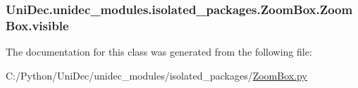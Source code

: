 \subsubsection[{visible}]{\setlength{\rightskip}{0pt plus 5cm}Uni\+Dec.\+unidec\+\_\+modules.\+isolated\+\_\+packages.\+Zoom\+Box.\+Zoom\+Box.\+visible}\label{class_uni_dec_1_1unidec__modules_1_1isolated__packages_1_1_zoom_box_1_1_zoom_box_a2d7d9c153ef672843f244d9a288479ac}


The documentation for this class was generated from the following file\+:\begin{DoxyCompactItemize}
\item 
C\+:/\+Python/\+Uni\+Dec/unidec\+\_\+modules/isolated\+\_\+packages/\hyperlink{_zoom_box_8py}{Zoom\+Box.\+py}\end{DoxyCompactItemize}
